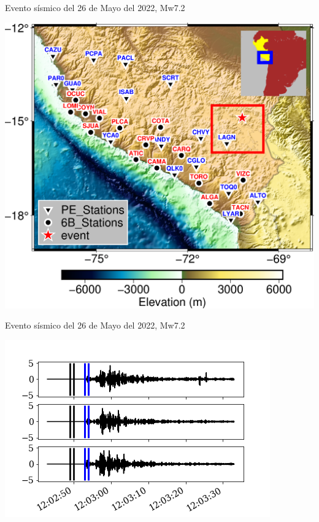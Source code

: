 \documentclass{beamer}
\begin{document}
\begin{frame}
 {Evento sísmico del 26 de Mayo del 2022, Mw7.2}
 
 \begin{minipage}{0.9\linewidth}
  \centering \includegraphics[width=0.9\linewidth]{images/map_peru}
 \end{minipage}
  
\end{frame}


\begin{frame}
 {Evento sísmico del 26 de Mayo del 2022, Mw7.2}
 
 \begin{minipage}{0.9\linewidth}
  \centering \includegraphics[width=0.9\linewidth]{images/ventanas.png}
 \end{minipage}
  
\end{frame}
\end{document}
